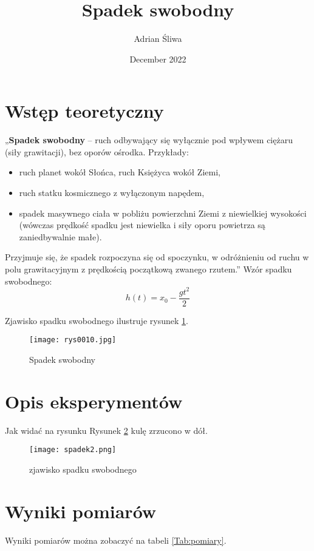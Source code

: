 \documentclass{article}
\title{Spadek swobodny}
\author{Adrian Śliwa}
\date{December 2022}
\begin{document}
\maketitle

\tableofcontents

\newpage
\section{Wstęp teoretyczny}
„\textbf{Spadek swobodny} – ruch odbywający się wyłącznie pod wpływem ciężaru (siły grawitacji), bez
oporów ośrodka.
Przykłady:
\begin{itemize}
    \item  ruch planet wokół Słońca, ruch Księżyca wokół Ziemi,
    \item ruch statku kosmicznego z wyłączonym napędem,
    \item spadek masywnego ciała w pobliżu powierzchni Ziemi z niewielkiej wysokości (wówczas prędkość
spadku jest niewielka i siły oporu powietrza są zaniedbywalnie małe).
\end{itemize}
Przyjmuje się, że spadek rozpoczyna się od spoczynku, w odróżnieniu od ruchu w polu grawitacyjnym
z prędkością początkową zwanego rzutem.”
Wzór spadku swobodnego:
\begin{equation}
h(t) = x_0 - \frac{gt^2}{2}
\end{equation}

Zjawisko spadku swobodnego ilustruje rysunek \ref{fig:spadek_swobodny}.

\begin{figure}[hbt!]
    \centering
    \texttt{[image: rys0010.jpg]}
    \caption{Spadek swobodny}
    \label{fig:spadek_swobodny}
\end{figure}

\newpage

\section{Opis eksperymentów}
Jak widać na rysunku Rysunek \ref{fig:zjawisko} kulę zrzucono w dół.
\begin{figure}[hbt!]
    \centering
    \texttt{[image: spadek2.png]}
    \caption{zjawisko spadku swobodnego}
    \label{fig:zjawisko}
\end{figure}

\newpage
\section{Wyniki pomiarów}
Wyniki pomiarów można zobaczyć na tabeli \ref{Tab:pomiary}.
\end{document}
